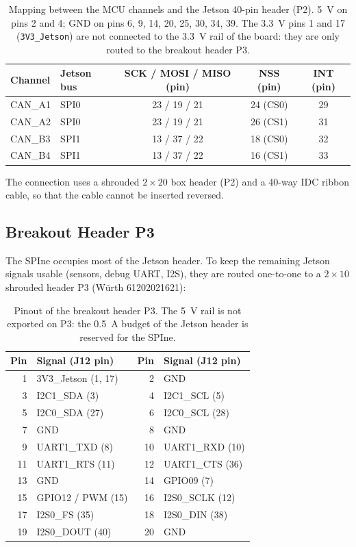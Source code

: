 \documentclass[11pt,a4paper]{article}
\newcommand{\net}[1]{\texttt{#1}}
\begin{document}
\begin{table}[H]
\centering
\begin{tabular}{llccc}
\toprule
Channel & Jetson bus & SCK / MOSI / MISO (pin) & NSS (pin) & INT (pin) \\
\midrule
CAN\_A1 & SPI0 & 23 / 19 / 21 & 24 (CS0) & 29 \\
CAN\_A2 & SPI0 & 23 / 19 / 21 & 26 (CS1) & 31 \\
CAN\_B3 & SPI1 & 13 / 37 / 22 & 18 (CS0) & 32 \\
CAN\_B4 & SPI1 & 13 / 37 / 22 & 16 (CS1) & 33 \\
\bottomrule
\end{tabular}
\caption{Mapping between the MCU channels and the Jetson 40-pin header (P2). \qty{5}{V} on pins 2
and 4; GND on pins 6, 9, 14, 20, 25, 30, 34, 39. The \qty{3.3}{V} pins 1 and 17 (\net{3V3\_Jetson}) are not
connected to the \qty{3.3}{V} rail of the board: they are only routed to the breakout header P3.}
\label{tab:spimap}
\end{table}

The connection uses a shrouded $2{\times}20$ box header (P2) and a 40-way IDC ribbon cable, so
that the cable cannot be inserted reversed.

\subsection{Breakout Header P3}\label{sec:p3}

The SPIne occupies most of the Jetson header. To keep the remaining Jetson signals usable
(sensors, debug UART, I2S), they are routed one-to-one to a $2{\times}10$ shrouded header P3 (Würth
61202021621):

\begin{table}[H]
\centering
\begin{tabular}{rl|rl}
\toprule
Pin & Signal (J12 pin) & Pin & Signal (J12 pin) \\
\midrule
1  & 3V3\_Jetson (1, 17) & 2  & GND \\
3  & I2C1\_SDA (3)       & 4  & I2C1\_SCL (5) \\
5  & I2C0\_SDA (27)      & 6  & I2C0\_SCL (28) \\
7  & GND                 & 8  & GND \\
9  & UART1\_TXD (8)      & 10 & UART1\_RXD (10) \\
11 & UART1\_RTS (11)     & 12 & UART1\_CTS (36) \\
13 & GND                 & 14 & GPIO09 (7) \\
15 & GPIO12 / PWM (15)   & 16 & I2S0\_SCLK (12) \\
17 & I2S0\_FS (35)       & 18 & I2S0\_DIN (38) \\
19 & I2S0\_DOUT (40)     & 20 & GND \\
\bottomrule
\end{tabular}
\caption{Pinout of the breakout header P3. The \qty{5}{V} rail is not exported on P3: the \qty{0.5}{A} budget
of the Jetson header is reserved for the SPIne.}
\label{tab:p3}
\end{table}
\end{document}
